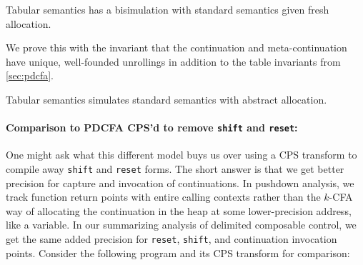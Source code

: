 \begin{conjecture}\label{thm:concrete-sr}
  Tabular semantics has a bisimulation with standard semantics given fresh allocation.
\end{conjecture}

We prove this with the invariant that the continuation and meta-continuation have unique, well-founded unrollings in addition to the table invariants from \autoref{sec:pdcfa}.

\begin{conjecture}\label{thm:sound-sr}
  Tabular semantics simulates standard semantics with abstract allocation.
\end{conjecture}

\paragraph{Comparison to PDCFA CPS'd to remove {\tt shift} and {\tt reset}:}{
  One might ask what this different model buys us over using a CPS transform to compile away {\tt shift} and {\tt reset} forms.
%
The short answer is that we get better precision for capture and invocation of continuations.
%
In pushdown analysis, we track function return points with entire calling contexts rather than the $k$-CFA way of allocating the continuation in the heap at some lower-precision address, like a variable.
%
In our summarizing analysis of delimited composable control, we get the same added precision for {\tt reset}, {\tt shift}, and continuation invocation points.
%
Consider the following program and its CPS transform for comparison:
\begin{SCodeFlow}\begin{RktBlk}\begin{SingleColumn}\RktPn{(}\mbox{}\RktPn{(}\RktPn{[}\mbox{}\RktPn{(}\RktSym{$\lambda$}\mbox{}\RktPn{(}\RktPn{)}\mbox{}\RktPn{)}\RktPn{]}

\mbox{}\RktPn{[}\mbox{}\RktPn{(}\RktSym{$\lambda$}\mbox{}\RktPn{(}\RktPn{)}\mbox{}\RktPn{(}\mbox{}\mbox{}\RktPn{(}\mbox{}\RktPn{(}\mbox{}\RktPn{)}\RktPn{)}\RktPn{)}\RktPn{)}\RktPn{]}


\end{SingleColumn}
\end{RktBlk}
\end{SCodeFlow}}
